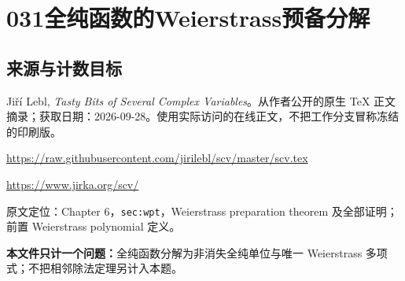 \documentclass[UTF8,11pt]{ctexart}
\theoremstyle{definition}
\begin{document}
\section*{031\quad 全纯函数的Weierstrass预备分解}
\subsection*{来源与计数目标}
Ji\v{r}\'i Lebl, \emph{Tasty Bits of Several Complex Variables}。从作者公开的原生 TeX 正文摘录；获取日期：2026-09-28。使用实际访问的在线正文，不把工作分支冒称冻结的印刷版。
\par\url{https://raw.githubusercontent.com/jirilebl/scv/master/scv.tex}
\par\url{https://www.jirka.org/scv/}
\par 原文定位：Chapter 6，\texttt{sec:wpt}，Weierstrass preparation theorem 及全部证明；前置 Weierstrass polynomial 定义。
\par\textbf{本文件只计一个问题：}全纯函数分解为非消失全纯单位与唯一 Weierstrass 多项式；不把相邻除法定理另计入本题。
\end{document}
